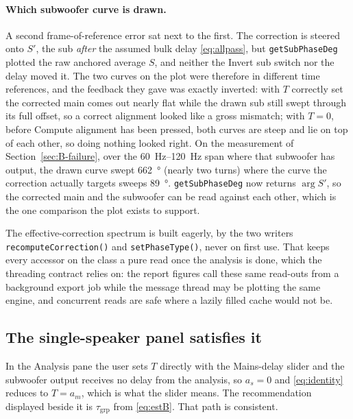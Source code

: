 \documentclass[11pt,a4paper]{article}
\newcommand{\code}[1]{\texttt{\small #1}}
\begin{document}
\paragraph{Which subwoofer curve is drawn.} A second frame-of-reference error
sat next to the first. The correction is steered onto $S'$, the sub
\emph{after} the assumed bulk delay \eqref{eq:allpass}, but
\code{getSubPhaseDeg} plotted the raw anchored average $S$, and neither the
Invert sub switch nor the delay moved it. The two curves on the plot were
therefore in different time references, and the feedback they gave was exactly
inverted: with $T$ correctly set the corrected main comes out nearly flat while
the drawn sub still swept through its full offset, so a correct alignment looked
like a gross mismatch; with $T = 0$, before Compute alignment has been pressed,
both curves are steep and lie on top of each other, so doing nothing looked
right. On the measurement of Section~\ref{sec:B-failure}, over the
\SIrange{60}{120}{\hertz} span where that subwoofer has output, the drawn curve
swept \SI{662}{\degree} (nearly two turns) where the curve the correction
actually targets sweeps \SI{89}{\degree}. \code{getSubPhaseDeg} now returns
$\arg S'$, so the corrected main and the subwoofer can be read against each
other, which is the one comparison the plot exists to support.

The effective-correction spectrum is built eagerly, by the two writers
\code{recomputeCorrection()} and \code{setPhaseType()}, never on first use. That keeps every accessor on the class
a pure read once the analysis is done, which the threading contract relies on:
the report figures call these same read-outs from a background export job while
the message thread may be plotting the same engine, and concurrent reads are
safe where a lazily filled cache would not be.

\subsection{The single-speaker panel satisfies it}

In the Analysis pane the user sets $T$ directly with the Mains-delay slider and
the subwoofer output receives no delay from the analysis, so $a_s = 0$ and
\eqref{eq:identity} reduces to $T = a_m$, which is what the slider means. The
recommendation displayed beside it is $\tau_{\mathrm{grp}}$ from
\eqref{eq:estB}. That path is consistent.

\end{document}
